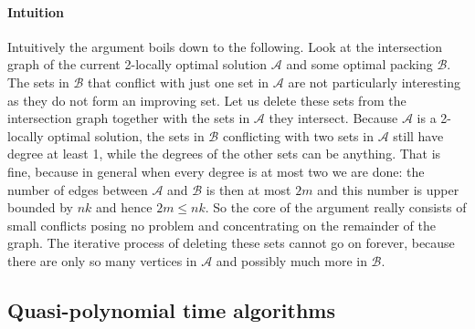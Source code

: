 
\paragraph{Intuition} Intuitively the argument boils down to the following. Look at the intersection graph of the current 2-locally optimal solution $\mathcal{A}$ and some optimal packing $\mathcal{B}$. The sets in $\mathcal{B}$ that conflict with just one set in $\mathcal{A}$ are not particularly interesting as they do not form an improving set. Let us delete these sets from the intersection graph together with the sets in $\mathcal{A}$ they intersect. Because $\mathcal{A}$ is a 2-locally optimal solution, the sets in $\mathcal{B}$ conflicting with two sets in $\mathcal{A}$ still have degree at least 1, while the degrees of the other sets can be anything. That is fine, because in general when every degree is at most two we are done: the number of edges between $\mathcal{A}$ and $\mathcal{B}$ is then at most $2m$ and this number is upper bounded by $nk$ and hence $2m \leq nk$. So the core of the argument really consists of small conflicts posing no problem and concentrating on the remainder of the graph. The iterative process of deleting these sets cannot go on forever, because there are only so many vertices in $\mathcal{A}$ and possibly much more in $\mathcal{B}$.

\subsection{Quasi-polynomial time algorithms}\label{subsec:UnweightedQuasi}


